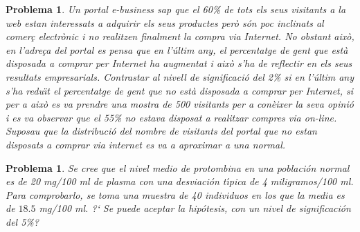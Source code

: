 \documentclass[11pt]{article}
\newcounter{prbcont}
\newtheorem{problema}[prbcont]{Problema}
\begin{document}
\begin{problema}
Un portal e-business sap que el 60\% de tots els seus visitants a la web estan interessats a adquirir els seus productes per\`o s\'on poc inclinats al comer\c{c} electr\`onic i no realitzen finalment la compra via Internet. No obstant aix\`o, en l'adre\c{c}a del portal es pensa que en l'\'ultim any, el percentatge de gent que est\`a disposada a comprar per Internet ha augmentat i aix\`o s'ha de reflectir en els seus resultats empresarials. Contrastar al nivell de significaci\'o del 2\% si en l'\'ultim any s'ha redu\"{\i}t el percentatge de gent que no est\`a disposada a comprar per Internet, si per a aix\`o es va prendre una mostra de 500 visitants per a con\`eixer la seva opini\'o i es va observar que el 55\% no estava disposat a realitzar compres via on-line. 
Suposau que la distribuci\'o del nombre de visitants del portal que no estan disposats a comprar via internet es va a aproximar a una normal.
\end{problema}




\begin{problema}
Se cree que el nivel medio de protombina en una poblaci\'on normal es de 20 mg/100 ml de plasma con una desviaci\'on t\'{\i}pica de 4 miligramos/100 ml. Para comprobarlo, se toma una muestra de 40 individuos en los que la media es de $18.5$ mg/100 ml. ?` Se puede aceptar la hip\'otesis, con un nivel de significaci\'on del 5\%? 
\end{problema}
\end{document}
